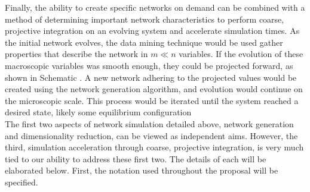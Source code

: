 \documentclass[11pt]{article}
\begin{document}
Finally, the ability to create specific networks on demand can be combined with a method of determining important network characteristics to perform coarse, projective integration on an evolving system and accelerate simulation times. As the initial network evolves, the data mining technique would be used gather properties that describe the network in $m \ll n$ variables. If the evolution of these macroscopic variables was smooth enough, they could be projected forward, as shown in Schematic \cite{cpi_schematic}. A new network adhering to the projected values would be created using the network generation algorithm, and evolution would continue on the microscopic scale. This process would be iterated until the system reached a desired state, likely some equilibrium configuration \vspace{1mm}\\
The first two aspects of network simulation detailed above, network generation and dimensionality reduction, can be viewed as independent aims. However, the third, simulation acceleration through coarse, projective integration, is very much tied to our ability to address these first two. The details of each will be elaborated below. First, the notation used throughout the proposal will be specified.
\end{document}
